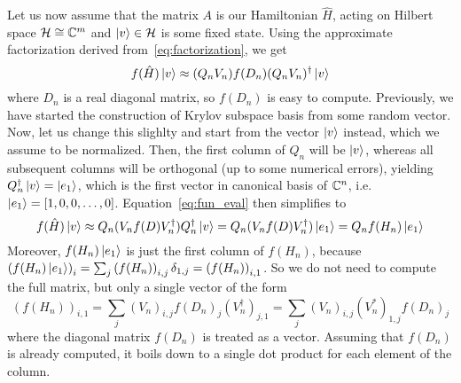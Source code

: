 Let us now assume that the matrix \(A\) is our Hamiltonian \(\hat{H}\), acting on Hilbert space \(\mathcal{H}\cong \mathbb{C}^m\)
and \(\ket{v}\in \mathcal{H}\) is some fixed state.
Using the approximate factorization derived from~\eqref{eq:factorization}, we get
\begin{equation}
	f(\hat{H})\ket{v} \approx (Q_n V_n) f(D_n) (Q_n V_n)^{\dagger} \ket{v} 
	\label{eq:fun_eval}
\end{equation}
where \(D_n\) is a real diagonal matrix, so \(f(D_n)\) is easy to compute.
Previously, we have started the construction of Krylov subspace basis from some random vector. Now, let us
change this slighlty and start from the vector \(\ket{v}\) instead, which we assume to be normalized. Then,
the first column of \(Q_n\) will be \(\ket{v}\), whereas all subsequent columns will be orthogonal (up to some
numerical errors), yielding \(Q_n^{\dagger}\ket{v} = \ket{e_1}\), which is the first vector in canonical basis
of \( \mathbb{C}^n \), i.e. \( \ket{e_1} = \left[1,0,0,\ldots,0\right] \). Equation~\eqref{eq:fun_eval} then
simplifies to
\begin{equation}
	f(\hat{H}) \ket{v} \approx Q_n (V_n f(D) V_n^{\dagger}) Q_n^{\dagger} \ket{v} = Q_n (V_n f(D) V_n^{\dagger}) \ket{e_1}
	= Q_n f(H_n) \ket{e_1} 
	\label{eq:lanczos_function}
\end{equation}
Moreover, \(f(H_n) \ket{e_1}\) is just the first column of \(f(H_n)\), because \( \left(f(H_n) \ket{e_1}\right)_i =
\sum_j \left(f(H_n)\right)_{i,j} \delta_{1,j} = \left(f(H_n)\right)_{i,1}\). So we do not need to compute the full
matrix, but only a single vector of the form
\begin{equation}
	\left(f(H_n)\right)_{i,1} = \sum_j \left(V_n\right)_{i,j} f(D_n)_j \left(V_n^{\dagger}\right)_{j,1}
	=  \sum_j \left(V_n\right)_{i,j} \left(V_n^{\ast}\right)_{1,j} f(D_n)_j 
\end{equation}
where the diagonal matrix \(f(D_n)\) is treated as a vector. Assuming that \(f(D_n)\) is already computed, it boils
down to a single dot product for each element of the column.

